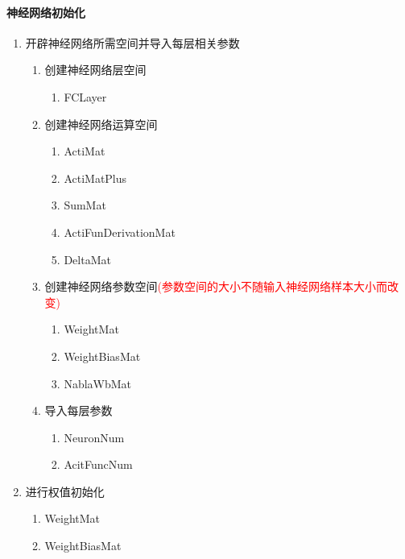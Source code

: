 \paragraph{神经网络初始化}
\begin{enumerate}
  \item 开辟神经网络所需空间并导入每层相关参数
  \begin{enumerate}[(1)]
    \item 创建神经网络层空间
    \begin{enumerate}[<1>]
      \item FCLayer
    \end{enumerate}
    \item 创建神经网络运算空间
    \begin{enumerate}[<1>]
      \item ActiMat
      \item ActiMatPlus
      \item SumMat
      \item ActiFunDerivationMat
      \item DeltaMat
    \end{enumerate}
    \item 创建神经网络参数空间\textcolor{red}{(参数空间的大小不随输入神经网络样本大小而改变)}
    \begin{enumerate}[<1>]
      \item WeightMat
      \item WeightBiasMat
      \item NablaWbMat
    \end{enumerate}
    \item 导入每层参数
    \begin{enumerate}[<1>]
      \item NeuronNum
      \item AcitFuncNum
    \end{enumerate}
  \end{enumerate}
  \item 进行权值初始化
  \begin{enumerate}
    \item WeightMat
    \item WeightBiasMat
  \end{enumerate}
\end{enumerate}




